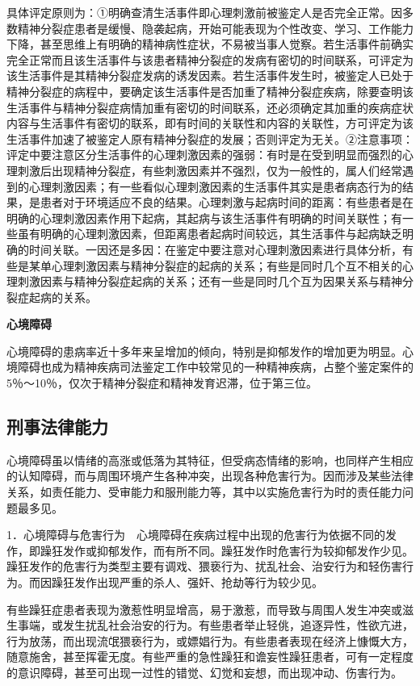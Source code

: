 具体评定原则为：①明确查清生活事件即心理刺激前被鉴定人是否完全正常。因多数精神分裂症患者是缓慢、隐袭起病，开始可能表现为个性改变、学习、工作能力下降，甚至思维上有明确的精神病性症状，不易被当事人觉察。若生活事件前确实完全正常而且该生活事件与该患者精神分裂症的发病有密切的时间联系，可评定为该生活事件是其精神分裂症发病的诱发因素。若生活事件发生时，被鉴定人已处于精神分裂症的病程中，要确定该生活事件是否加重了精神分裂症疾病，除要查明该生活事件与精神分裂症病情加重有密切的时间联系，还必须确定其加重的疾病症状内容与生活事件有密切的联系，即有时间的关联性和内容的关联性，方可评定为该生活事件加速了被鉴定人原有精神分裂症的发展；否则评定为无关。②注意事项：评定中要注意区分生活事件的心理刺激因素的强弱：有时是在受到明显而强烈的心理刺激后出现精神分裂症，有些刺激因素并不强烈，仅为一般性的，属人们经常遇到的心理刺激因素；有一些看似心理刺激因素的生活事件其实是患者病态行为的结果，是患者对于环境适应不良的结果。心理刺激与起病时间的距离：有些患者是在明确的心理刺激因素作用下起病，其起病与该生活事件有明确的时间关联性；有一些虽有明确的心理刺激因素，但距离患者起病时间较远，其生活事件与起病缺乏明确的时间关联。一因还是多因：在鉴定中要注意对心理刺激因素进行具体分析，有些是某单心理刺激因素与精神分裂症的起病的关系；有些是同时几个互不相关的心理刺激因素与精神分裂症起病的关系；还有一些是同时几个互为因果关系与精神分裂症起病的关系。

\textbf{心境障碍}

心境障碍的患病率近十多年来呈增加的倾向，特别是抑郁发作的增加更为明显。心境障碍也成为精神疾病司法鉴定工作中较常见的一种精神疾病，占整个鉴定案件的5％～10％，仅次于精神分裂症和精神发育迟滞，位于第三位。

\subsection{刑事法律能力}

心境障碍虽以情绪的高涨或低落为其特征，但受病态情绪的影响，也同样产生相应的认知障碍，而与周围环境产生各种冲突，出现各种危害行为。因而涉及某些法律关系，如责任能力、受审能力和服刑能力等，其中以实施危害行为时的责任能力问题最多见。

1．心境障碍与危害行为　心境障碍在疾病过程中出现的危害行为依据不同的发作，即躁狂发作或抑郁发作，而有所不同。躁狂发作时危害行为较抑郁发作少见。躁狂发作的危害行为类型主要有调戏、猥亵行为、扰乱社会、治安行为和轻伤害行为。而因躁狂发作出现严重的杀人、强奸、抢劫等行为较少见。

有些躁狂症患者表现为激惹性明显增高，易于激惹，而导致与周围人发生冲突或滋生事端，或发生扰乱社会治安的行为。有些患者举止轻佻，追逐异性，性欲亢进，行为放荡，而出现流氓猥亵行为，或嫖娼行为。有些患者表现在经济上慷慨大方，随意施舍，甚至挥霍无度。有些严重的急性躁狂和谵妄性躁狂患者，可有一定程度的意识障碍，甚至可出现一过性的错觉、幻觉和妄想，而出现冲动、伤害行为。

